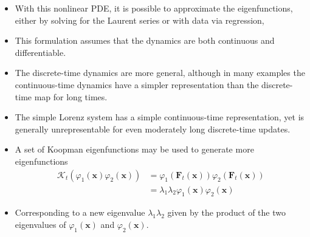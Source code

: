 \documentclass[hyperref={pdfpagemode=FullScreen},aspectratio=169]{beamer}
\begin{document}
\begin{frame}{}
\begin{itemize}
\setlength\itemsep{1em}
\item With this nonlinear PDE, it is possible to approximate the eigenfunctions, either by solving for the Laurent series or with data via regression,
\item This formulation assumes that the dynamics are both continuous and differentiable.
\item The discrete-time dynamics are more general, although in many examples the continuous-time dynamics have a simpler representation than the discrete-time map for long times.
\item The simple Lorenz system has a simple continuous-time representation, yet is generally unrepresentable for even moderately long discrete-time updates.
\item A set of Koopman eigenfunctions may be used to generate more eigenfunctions
\begin{align}
    \mathcal{K}_t(\varphi_1(\mathbf{x})\varphi_2(\mathbf{x})) &= \varphi_1(\mathbf{F}_t(\mathbf{x}))\varphi_2(\mathbf{F}_t(\mathbf{x})) \nonumber \\
    &= \lambda_1\lambda_2\varphi_1(\mathbf{x})\varphi_2(\mathbf{x})
\end{align}
\item Corresponding to a new eigenvalue $\lambda_1\lambda_2$ given by the product of the two eigenvalues of $\varphi_1(\mathbf{x})$ and $\varphi_2(\mathbf{x})$.
\end{itemize}
\end{frame}
\end{document}
